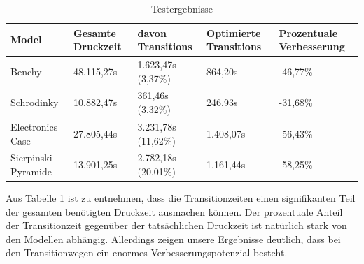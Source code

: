 \documentclass[12pt, a4paper]{article}
\begin{document}
\begin{table}[h!]
 \begin{tabular}{|l|p{1.9cm}|l|p{2.1cm}|p{2.1cm}|}
 Model & Gesamte Druckzeit & davon Transitions & Optimierte Transitions & Prozentuale Verbesserung \\
 \hline
 Benchy & 48.115,27s & 1.623,47s (3,37\%) & 864,20s & -46,77\% \\
 \hline
 Schrodinky & 10.882,47s & 361,46s (3,32\%) & 246,93s & -31,68\% \\
 \hline
 Electronics Case & 27.805,44s & 3.231,78s (11,62\%) & 1.408,07s & -56,43\% \\
 \hline
 Sierpinski Pyramide & 13.901,25s & 2.782,18s (20,01\%) & 1.161,44s & -58,25\% \\
 \hline
 \end{tabular}
 
\caption{Testergebnisse}
\label{tbl:ergebnisse}
\end{table}

Aus Tabelle \ref{tbl:ergebnisse} ist zu entnehmen, dass die Transitionzeiten einen signifikanten Teil der gesamten benötigten Druckzeit ausmachen können. Der prozentuale Anteil der Transitionzeit gegenüber der tatsächlichen Druckzeit ist natürlich stark von den Modellen abhängig. Allerdings zeigen unsere Ergebnisse deutlich, dass bei den Transitionwegen ein enormes Verbesserungspotenzial besteht.
\end{document}
